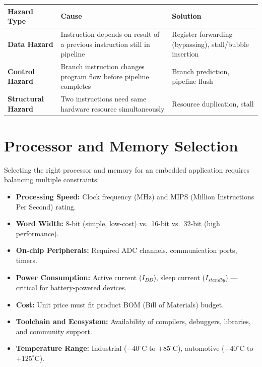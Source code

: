 \documentclass[12pt,a4paper]{article}
\renewcommand{\arraystretch}{1.45}
\begin{document}
\par\noindent
{\renewcommand{\arraystretch}{1.55}%
\begin{tabularx}{\linewidth}{|B{3.0cm}|Y|Y|}
\hline
\textbf{Hazard Type} & \textbf{Cause} & \textbf{Solution} \\
\hline
\textbf{Data Hazard} & Instruction depends on result of a previous instruction still in pipeline & Register forwarding (bypassing), stall/bubble insertion \\
\hline
\textbf{Control Hazard} & Branch instruction changes program flow before pipeline completes & Branch prediction, pipeline flush \\
\hline
\textbf{Structural Hazard} & Two instructions need same hardware resource simultaneously & Resource duplication, stall \\
\hline
\end{tabularx}}

\section{Processor and Memory Selection}

Selecting the right processor and memory for an embedded application requires balancing multiple constraints:

\begin{tcolorbox}[formulabox, title={\textbf{Processor Selection Criteria}}]
\begin{itemize}[leftmargin=*, itemsep=3pt]
  \item \textbf{Processing Speed:} Clock frequency (MHz) and MIPS (Million Instructions Per Second) rating.
  \item \textbf{Word Width:} 8-bit (simple, low-cost) vs.\ 16-bit vs.\ 32-bit (high performance).
  \item \textbf{On-chip Peripherals:} Required ADC channels, communication ports, timers.
  \item \textbf{Power Consumption:} Active current ($I_{DD}$), sleep current ($I_{standby}$) --- critical for battery-powered devices.
  \item \textbf{Cost:} Unit price must fit product BOM (Bill of Materials) budget.
  \item \textbf{Toolchain and Ecosystem:} Availability of compilers, debuggers, libraries, and community support.
  \item \textbf{Temperature Range:} Industrial ($-40^{\circ}$C to $+85^{\circ}$C), automotive ($-40^{\circ}$C to $+125^{\circ}$C).
\end{itemize}
\end{tcolorbox}
\end{document}
